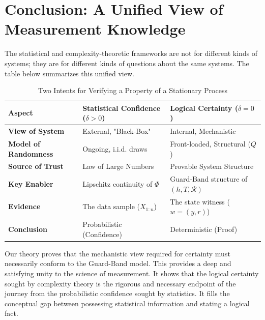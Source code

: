 \documentclass[12pt]{article}
\theoremstyle{definition}
\theoremstyle{plain}
\begin{document}
\section{Conclusion: A Unified View of Measurement Knowledge}

The statistical and complexity-theoretic frameworks are not for different kinds of systems; they are for different kinds of questions about the same systems. The table below summarizes this unified view.

\begin{table}[h!]
\centering
\caption{Two Intents for Verifying a Property of a Stationary Process}
\label{tab:unification}
\begin{tabular}{@{}lll@{}}
\toprule
\textbf{Aspect} & \textbf{Statistical Confidence ($\delta > 0$)} & \textbf{Logical Certainty ($\delta = 0$)} \\ \midrule
\textbf{View of System} & External, "Black-Box" & Internal, Mechanistic \\
\textbf{Model of Randomness} & Ongoing, i.i.d. draws & Front-loaded, Structural ($Q$) \\
\textbf{Source of Trust} & Law of Large Numbers & Provable System Structure \\
\textbf{Key Enabler} & Lipschitz continuity of $\Phi$ & Guard-Band structure of $(h, T, \mathcal{R})$ \\
\textbf{Evidence} & The data sample ($X_{1:n}$) & The state witness ($w=(y,r)$) \\
\textbf{Conclusion} & Probabilistic (Confidence) & Deterministic (Proof) \\ \bottomrule
\end{tabular}
\end{table}

Our theory proves that the mechanistic view required for certainty must necessarily conform to the Guard-Band model. This provides a deep and satisfying unity to the science of measurement. It shows that the logical certainty sought by complexity theory is the rigorous and necessary endpoint of the journey from the probabilistic confidence sought by statistics. It fills the conceptual gap between possessing statistical information and stating a logical fact.
\end{document}
